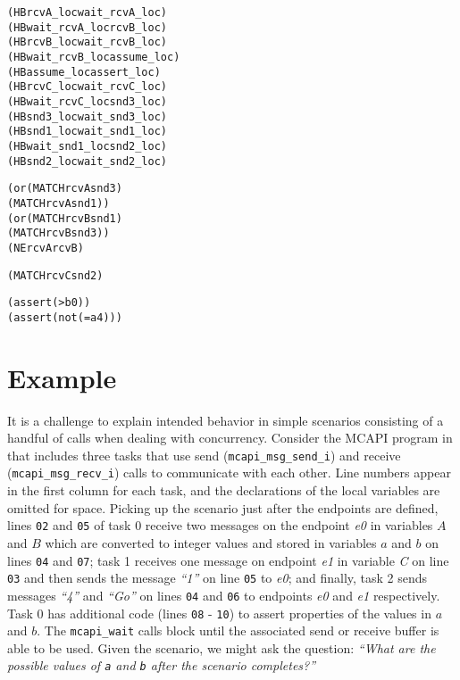 \newsavebox{\boxSMT}
\begin{lrbox}{\boxSMT}
\begin{minipage}[c]{0.4\linewidth}
\begin{alltt}
(HB rcvA_loc wait_rcvA_loc)
(HB wait_rcvA_loc rcvB_loc)
(HB rcvB_loc wait_rcvB_loc)
(HB wait_rcvB_loc assume_loc)
(HB assume_loc assert_loc)
(HB rcvC_loc wait_rcvC_loc)
(HB wait_rcvC_loc snd3_loc)
(HB snd3_loc wait_snd3_loc)
(HB snd1_loc wait_snd1_loc)
(HB wait_snd1_loc snd2_loc)
(HB snd2_loc wait_snd2_loc)

(or (MATCH rcvA snd3)
    (MATCH rcvA snd1))
(or (MATCH rcvB  snd1)
    (MATCH rcvB snd3))
(NE rcvA rcvB)

(MATCH rcvC snd2)

(assert (> b 0))
(assert (not (= a 4)))
\end{alltt}
\end{minipage}
\end{lrbox}

\section{Example}

It is a challenge to explain intended behavior in simple scenarios
consisting of a handful of calls when dealing with concurrency. Consider
the MCAPI program in  that includes three
tasks that use send (\texttt{mcapi\_msg\_send\_i}) and receive
(\texttt{mcapi\_msg\_recv\_i}) calls to communicate with each other.
Line numbers appear in the first column for each task, and the
declarations of the local variables are omitted for space. Picking up
the scenario just after the endpoints are defined, lines \texttt{02}
and \texttt{05} of task 0 receive two messages on the endpoint
\textit{e0} in variables $A$ and $B$ which are
converted to integer values and stored in variables $a$ and
$b$ on lines \texttt{04} and \texttt{07}; task 1 receives one
message on endpoint \textit{e1} in variable \textit{C} on line
\texttt{03} and then sends the message \textit{``1''} on line \texttt{05} to
\textit{e0}; and finally, task 2 sends messages \textit{``4''} and \textit{``Go''} on
lines \texttt{04} and \texttt{06} to endpoints \textit{e0} and
\textit{e1} respectively. Task 0 has additional code (lines \texttt{08} -
\texttt{10}) to assert properties of the values in $a$ and
$b$. The \texttt{mcapi\_wait} calls block until the associated
send or receive buffer is able to be used. Given the scenario, we
might ask the question: \emph{``What are the possible values of
\texttt{a} and \texttt{b} after the scenario completes?''}


